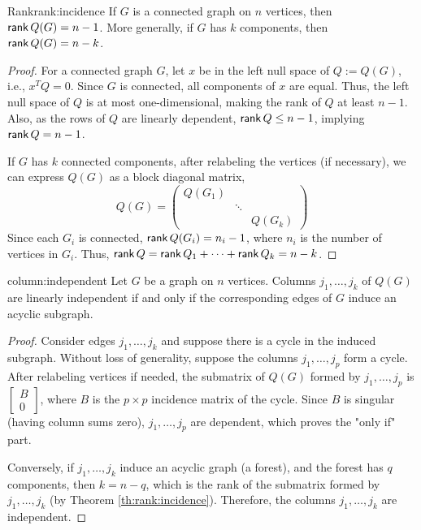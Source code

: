 \documentclass[../basic_graph_theory.tex]{subfiles}
\begin{document}
\begin{Thm}{Rank}{rank:incidence}
  If \(G\) is a connected graph on \(n\) vertices, then \(\operatorname{\mathsf{rank}} Q(G) = n - 1\). More generally, if \(G\) has \(k\) components, then \(\operatorname{\mathsf{rank}} Q(G) = n - k\).
\end{Thm}
\begin{proof}
  For a connected graph \(G\), let \(x\) be in the left null space of \(Q := Q(G)\), i.e., \(x^TQ = 0\). Since \(G\) is connected, all components of \(x\) are equal. Thus, the left null space of \(Q\) is at most one-dimensional, making the rank of \(Q\) at least \(n - 1\). Also, as the rows of \(Q\) are linearly dependent, \(\operatorname{\mathsf{rank}} Q \leq n - 1\), implying \(\operatorname{\mathsf{rank}} Q = n - 1\).

  If \(G\) has \(k\) connected components, after relabeling the vertices (if necessary), we can express \(Q(G)\) as a block diagonal matrix,
  \[
    Q(G) = \begin{pmatrix} Q(G_1) & & \\ & \ddots & \\ & & Q(G_k) \end{pmatrix}
  \]
  Since each \(G_i\) is connected, \(\operatorname{\mathsf{rank}} Q(G_i) = n_i - 1\), where \(n_i\) is the number of vertices in \(G_i\). Thus, \(\operatorname{\mathsf{rank}} Q = \operatorname{\mathsf{rank}} Q_1 + \dots + \operatorname{\mathsf{rank}} Q_k = n - k\).
\end{proof}

\begin{Thm}{}{column:independent}
  Let \(G\) be a graph on \(n\) vertices. Columns \(j_1, \dots, j_k\) of \(Q(G)\) are linearly independent if and only if the corresponding edges of \(G\) induce an acyclic subgraph.
\end{Thm}
\begin{proof}
  Consider edges \(j_1, \dots, j_k\) and suppose there is a cycle in the induced subgraph. Without loss of generality, suppose the columns \(j_1, \dots, j_p\) form a cycle. After relabeling vertices if needed, the submatrix of \(Q(G)\) formed by \(j_1, \dots, j_p\) is \(\begin{bmatrix} B \\ 0 \end{bmatrix}\), where \(B\) is the \(p \times p\) incidence matrix of the cycle. Since \(B\) is singular (having column sums zero), \(j_1, \dots, j_p\) are dependent, which proves the "only if" part.

  Conversely, if \(j_1, \dots, j_k\) induce an acyclic graph (a forest), and the forest has \(q\) components, then \(k = n - q\), which is the rank of the submatrix formed by \(j_1, \dots, j_k\) (by Theorem \ref{th:rank:incidence}). Therefore, the columns \(j_1, \dots, j_k\) are independent.
\end{proof}
\end{document}
